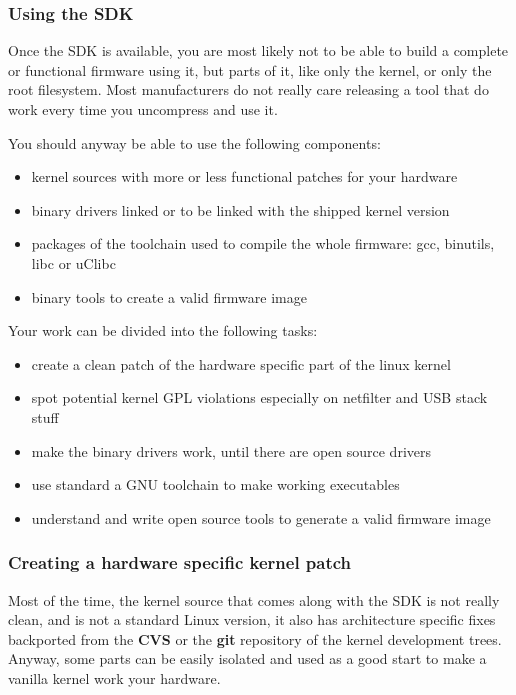 \subsubsection{Using the SDK}

Once the SDK is available, you are most likely not to be able to build a complete
or functional firmware using it, but parts of it, like only the kernel, or only
the root filesystem. Most manufacturers do not really care releasing a tool that
do work every time you uncompress and use it.

You should anyway be able to use the following components:

\begin{itemize}
\item kernel sources with more or less functional patches for your hardware
\item binary drivers linked or to be linked with the shipped kernel version
\item packages of the toolchain used to compile the whole firmware: gcc, binutils, libc or uClibc
\item binary tools to create a valid firmware image
\end{itemize}

Your work can be divided into the following tasks:

\begin{itemize}
\item create a clean patch of the hardware specific part of the linux kernel
\item spot potential kernel GPL violations especially on netfilter and USB stack stuff
\item make the binary drivers work, until there are open source drivers
\item use standard a GNU toolchain to make working executables
\item understand and write open source tools to generate a valid firmware image
\end{itemize}

\subsubsection{Creating a hardware specific kernel patch}

Most of the time, the kernel source that comes along with the SDK is not really 
clean, and is not a standard Linux version, it also has architecture specific 
fixes backported from the \textbf{CVS} or the \textbf{git} repository of the 
kernel development trees. Anyway, some parts can be easily isolated and used as 
a good start to make a vanilla kernel work your hardware.

